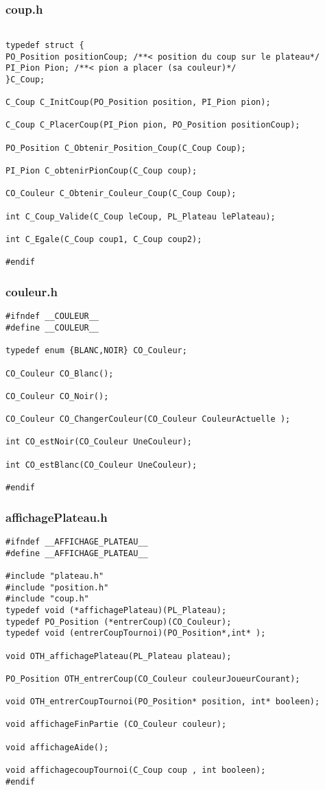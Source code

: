 \subsubsection{coup.h}
\begin{lstlisting}

typedef struct {
PO_Position positionCoup; /**< position du coup sur le plateau*/
PI_Pion Pion; /**< pion a placer (sa couleur)*/
}C_Coup;

C_Coup C_InitCoup(PO_Position position, PI_Pion pion);

C_Coup C_PlacerCoup(PI_Pion pion, PO_Position positionCoup);

PO_Position C_Obtenir_Position_Coup(C_Coup Coup);

PI_Pion C_obtenirPionCoup(C_Coup coup);

CO_Couleur C_Obtenir_Couleur_Coup(C_Coup Coup);

int C_Coup_Valide(C_Coup leCoup, PL_Plateau lePlateau);

int C_Egale(C_Coup coup1, C_Coup coup2);

#endif

\end{lstlisting}


\subsubsection{couleur.h}
\begin{lstlisting}
#ifndef __COULEUR__
#define __COULEUR__

typedef enum {BLANC,NOIR} CO_Couleur;

CO_Couleur CO_Blanc();

CO_Couleur CO_Noir();

CO_Couleur CO_ChangerCouleur(CO_Couleur CouleurActuelle );

int CO_estNoir(CO_Couleur UneCouleur);

int CO_estBlanc(CO_Couleur UneCouleur);

#endif

\end{lstlisting}

\subsubsection{affichagePlateau.h}
\begin{lstlisting}
#ifndef __AFFICHAGE_PLATEAU__
#define __AFFICHAGE_PLATEAU__

#include "plateau.h"
#include "position.h"
#include "coup.h"
typedef void (*affichagePlateau)(PL_Plateau);
typedef PO_Position (*entrerCoup)(CO_Couleur);
typedef void (entrerCoupTournoi)(PO_Position*,int* );

void OTH_affichagePlateau(PL_Plateau plateau);

PO_Position OTH_entrerCoup(CO_Couleur couleurJoueurCourant);

void OTH_entrerCoupTournoi(PO_Position* position, int* booleen);

void affichageFinPartie (CO_Couleur couleur);

void affichageAide();

void affichagecoupTournoi(C_Coup coup , int booleen);
#endif
\end{lstlisting}
